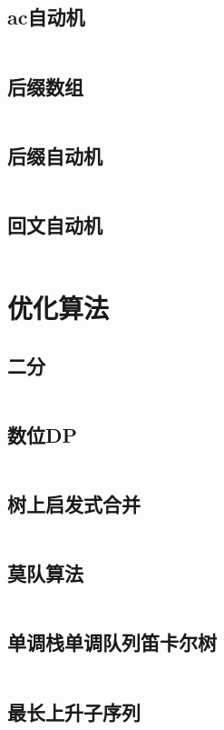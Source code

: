 \documentclass[a4paper,13.6pt]{article}
\begin{document}
\begin{CJK}{UTF8}{gbsn}
\subsection{ac自动机}
\inputminted{c++}{../ACM_Template/String/Aho-Corasick_Automaton.cpp}
\subsection{后缀数组}
\inputminted{c++}{../ACM_Template/String/Suffix_Array.cpp}
\subsection{后缀自动机}
\inputminted{c++}{../ACM_Template/String/Suffix_Automation.cpp}
\subsection{回文自动机}
\inputminted{c++}{../ACM_Template/String/Palindrome_Automata.cpp}

\newpage
\section{优化算法}
\subsection{二分}
\inputminted{c++}{../ACM_Template/Optimize/Binary_Search.cpp}
\subsection{数位DP}
\inputminted{c++}{../ACM_Template/Optimize/Digit_Statistics.cpp}
\subsection{树上启发式合并}
\inputminted{c++}{../ACM_Template/Optimize/DSU_On_Tree.cpp}
\subsection{莫队算法}
\inputminted{c++}{../ACM_Template/Optimize/Mo_Algorithm.cpp}
\subsection{单调栈单调队列笛卡尔树}
\inputminted{c++}{../ACM_Template/Optimize/Monotone_Stack_Queue_Tree.cpp}
\subsection{最长上升子序列}
\inputminted{c++}{../ACM_Template/Optimize/The_Longest_Increasing_Subsequence.cpp}


\end{CJK}
\end{document}
